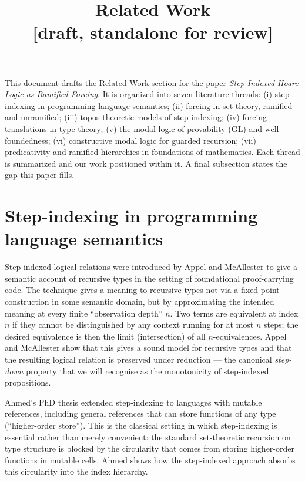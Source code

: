 \documentclass[11pt]{article}
\title{Related Work \\ \large{[draft, standalone for review]}}
\author{}
\date{}
\begin{document}
\maketitle

\noindent
This document drafts the Related Work section for the paper
\emph{Step-Indexed Hoare Logic as Ramified Forcing}. It is organized
into seven literature threads: (i) step-indexing in programming
language semantics; (ii) forcing in set theory, ramified and
unramified; (iii) topos-theoretic models of step-indexing; (iv)
forcing translations in type theory; (v) the modal logic of
provability (\textsf{GL}) and well-foundedness; (vi) constructive
modal logic for guarded recursion; (vii) predicativity and ramified
hierarchies in foundations of mathematics. Each thread is summarized
and our work positioned within it. A final subsection states the gap
this paper fills.

\section{Step-indexing in programming language semantics}

Step-indexed logical relations were introduced by Appel and McAllester
\cite{appel-mcallester2001} to give a semantic account of recursive
types in the setting of foundational proof-carrying code. The
technique gives a meaning to recursive types not via a fixed point
construction in some semantic domain, but by approximating the
intended meaning at every finite ``observation depth'' $n$. Two terms
are equivalent at index $n$ if they cannot be distinguished by any
context running for at most $n$ steps; the desired equivalence is then
the limit (intersection) of all $n$-equivalences. Appel and McAllester
show that this gives a sound model for recursive types and that the
resulting logical relation is preserved under reduction --- the
canonical \emph{step-down} property that we will recognise as the
monotonicity of step-indexed propositions.

Ahmed's PhD thesis \cite{ahmed2004} extended step-indexing to languages
with mutable references, including general references that can store
functions of any type (``higher-order store''). This is the classical
setting in which step-indexing is essential rather than merely
convenient: the standard set-theoretic recursion on type structure is
blocked by the circularity that comes from storing higher-order
functions in mutable cells. Ahmed shows how the step-indexed approach
absorbs this circularity into the index hierarchy.
\end{document}
